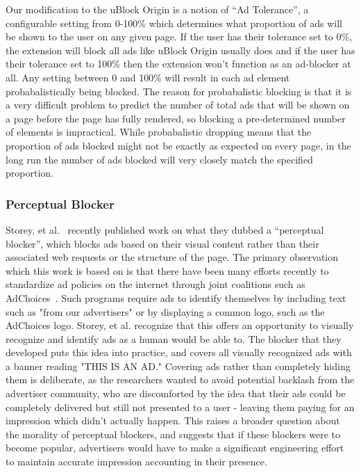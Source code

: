 Our modification to the uBlock Origin is a notion of ``Ad Tolerance'', a configurable setting from 0-100\% which determines what proportion of ads will be shown to the user on any given page.
If the user has their tolerance set to 0\%, the extension will block all ads like uBlock Origin usually does and if the user has their tolerance set to 100\% then the extension won't function as an ad-blocker at all.
Any setting between 0 and 100\% will result in each ad element probabalistically being blocked.
The reason for probabalistic blocking is that it is a very difficult problem to predict the number of total ads that will be shown on a page before the page has fully rendered, so blocking a pre-determined number of elements is impractical.
While probabalistic dropping means that the proportion of ads blocked might not be exactly as expected on every page, in the long run the number of ads blocked will very closely match the specified proportion.

\subsubsection{Perceptual Blocker}
Storey, et al.~\cite{storey2016future} recently published work on what they dubbed a ``perceptual blocker'', which blocks ads based on their visual content rather than their associated web requests or the structure of the page.
The primary observation which this work is based on is that there have been many efforts recently to standardize ad policies on the internet through joint coalitions such as AdChoices~\cite{adchoices}.
Such programs require ads to identify themselves by including text such as "from our advertisers" or by displaying a common logo, such as the AdChoices logo.
Storey, et al. recognize that this offers an opportunity to visually recognize and identify ads as a human would be able to.
The blocker that they developed puts this idea into practice, and covers all visually recognized ads with a banner reading "THIS IS AN AD."
Covering ads rather than completely hiding them is deliberate, as the researchers wanted to avoid potential backlash from the advertiser community, who are discomforted by the idea that their ads could be completely delivered but still not presented to a user - leaving them paying for an impression which didn't actually happen.
This raises a broader question about the morality of perceptual blockers, and suggests that if these blockers were to become popular, advertisers would have to make a significant engineering effort to maintain accurate impression accounting in their presence.


